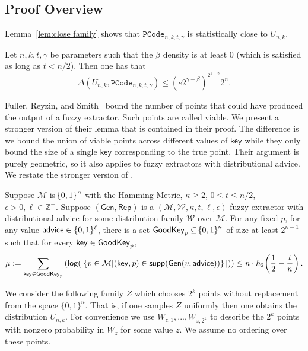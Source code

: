 \subsection{Proof Overview}
\label{ssec:proof overview}
Lemma~\ref{lem:close family} shows that $\mathtt{PCode}_{n, k, t, \gamma}$ is statistically close to $U_{n,k}$.

\begin{lemma}
 \label{lem:close family}
Let $n, k, t, \gamma$ be parameters such that the $\beta$ density is at least $0$ (which is satisfied as long as $t< n/2 $). Then one has that 
\[\Delta(U_{n,k}, \mathtt{PCode}_{n, k, t, \gamma}) \le \left(e2^{\gamma-\beta}\right)^{2^{k-\gamma}}2^n.\]
\end{lemma}

Fuller, Reyzin, and Smith~\cite{fuller2016fuzzy,fuller2020fuzzy} bound the number of points that could have produced the output of a fuzzy extractor.  Such points are called viable.  We present a stronger version of their lemma that is contained in their proof.  The difference is we bound the union of viable points across different values of $\mathsf{key}$ while they only bound the size of a single $\mathsf{key}$ corresponding to the true point.  Their argument is purely geometric, so it also applies to fuzzy extractors with distributional advice. 
We restate the stronger version of \cite[Lemma 5.2]{fuller2020fuzzy}.

\begin{lemma}
    \label{lem:smallgeneralviable}
    Suppose $\mathcal{M}$ is $\!\left\{ 0,1 \right\}^{n}$ with the Hamming Metric, $\kappa \geq 2$, $0 \leq t \leq n/2$, $\epsilon > 0, \ell\in\mathbb{Z}^+$. 
    Suppose $(\mathsf{Gen, Rep})$ is a $(\mathcal{M,W},\kappa, t, \ell, \epsilon)$-fuzzy extractor with distributional advice for some distribution family $\mathcal{W}$ over $\mathcal{M}$. 
    For any fixed $p$, for any value ${\mathsf{advice}} \in \{0, 1\}^\ell$, there is a set $\mathsf{GoodKey}_p \subseteq \!\left\{ 0,1 \right\}^{\kappa}$ of size at least $2^{\kappa - 1}$ such that for every $\mathsf{key} \in \mathsf{GoodKey}_p$,
    \[
      \mu:= \sum_{\mathsf{key} \in \mathsf{GoodKey}_p} \left( \mathsf{log}\!\left(|\!\left\{ v \in \mathcal{M}|\!\left(\mathsf{key}, p\right) \in \mathsf{supp}\!\left(\mathsf{Gen}(v, {\mathsf{advice}})\right) \right\}|\right)\right) \leq n \cdot h_2\!\left(\frac{1}{2} - \frac{t}{n}\right).
    \]   
\end{lemma}

We consider the following family $Z$ which chooses $2^k$ points without replacement from the space $\{0,1\}^n$.  That is, if one samples $Z$ uniformly then one obtains the distribution $U_{n,k}$. 
For convenience we use $W_{z, 1},..., W_{z,2^k}$ to describe the $2^k$ points with nonzero probability in $W_z$ for some value $z$.  We assume no ordering over these points.  

